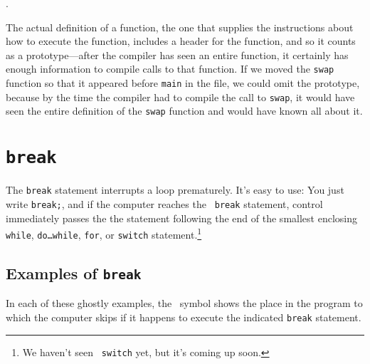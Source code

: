 \begin{flushleft}
\verb% double sqrt(double arg); %
\end{flushleft}
\noindent .

The actual definition of a function, the one that supplies the
instructions about how to execute the function, includes a header for
the function, and so it counts as a prototype---after the compiler has
seen an entire function, it certainly has enough information to compile
calls to that function.  If we moved the {\tt swap} function so that it
appeared before {\tt main} in the file, we could omit the prototype,
because by the time the compiler had to compile the call to {\tt swap},
it would have seen the entire definition of the {\tt swap} function and
would have known all about it.

\section{{\tt break}}
\label{break}

The {\tt break} statement interrupts a loop prematurely.  It's easy to
use: You just write {\tt break;}, and if the computer reaches the {\tt
break} statement, control immediately passes the the statement following
the end of the smallest enclosing {\tt while}, {\tt do{\rm\ldots}while},
{\tt for}, or {\tt switch} statement.\footnote{We haven't seen {\tt
switch} yet, but it's coming up soon.}

\subsection{Examples of {\tt break}}

In each of these ghostly examples, the \breakhere\ symbol shows the
place in the program to which the computer skips if it happens to
execute the indicated {\tt break} statement.
 
\begin{flushleft}
\verb% while ( . . . ) { % \\*
\verb%     . . . % \\*
\verb%     if ( . . . ) % \\*
\verb%       break ; % \\*
\verb%     . . . % \\*
\verb% } % \\*
\breakhere
\end{flushleft}


\begin{flushleft}
\verb% while ( . . . ) { % \\*
\verb%     for ( . . . ) { % \\*
\verb%         . . . % \\*
\verb%         if ( . . . ) % \\*
\verb%             break ; % \\*
\verb%         . . . % \\*
\verb%     } % \\*
\verb%    % \breakhere \\*
\verb%     . . .  % \\*
\verb% } % \\*
\end{flushleft}


